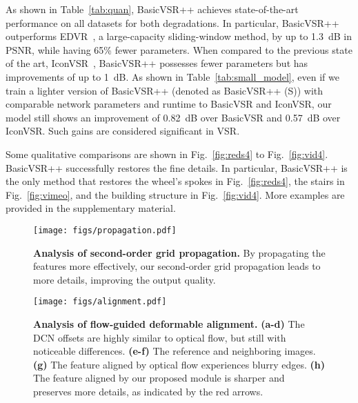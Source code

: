 \documentclass[10pt,twocolumn,letterpaper]{article}
\begin{document}
As shown in Table~\ref{tab:quan}, BasicVSR++ achieves state-of-the-art performance on all datasets for both degradations. In particular, BasicVSR++ outperforms EDVR~\cite{wang2019edvr}, a large-capacity sliding-window method, by up to 1.3~dB in PSNR, while having 65\% fewer parameters. When compared to the previous state of the art, IconVSR~\cite{chan2021basicvsr}, BasicVSR++ possesses fewer parameters but has improvements of up to 1~dB. As shown in Table~\ref{tab:small_model}, even if we train a lighter version of BasicVSR++ (denoted as BasicVSR++ (S)) with comparable network parameters and runtime to BasicVSR and IconVSR, our model still shows an improvement of 0.82~dB over BasicVSR and 0.57~dB over IconVSR. Such gains are considered significant in VSR.

Some qualitative comparisons are shown in Fig.~\ref{fig:reds4} to Fig.~\ref{fig:vid4}. BasicVSR++ successfully restores the fine details. In particular, BasicVSR++ is the only method that restores the wheel's spokes in Fig.~\ref{fig:reds4}, the stairs in Fig.~\ref{fig:vimeo}, and the building structure in Fig.~\ref{fig:vid4}. More examples are provided in the supplementary material.






 \begin{figure*}[!t]
    \begin{center}
        \texttt{[image: figs/propagation.pdf]}
        \vskip -0.3cm
        \caption{\textbf{Analysis of second-order grid propagation.} By propagating the features more effectively, our second-order grid propagation leads to more details, improving the output quality.}
        \label{fig:propagation}
    \end{center}
    \vspace{-0.5cm}
\end{figure*}
\begin{figure*}[!t]
    \begin{center}
        \texttt{[image: figs/alignment.pdf]}
        \vskip -0.3cm
        \caption{\textbf{Analysis of flow-guided deformable alignment.} \textbf{(a-d)} The DCN offsets are highly similar to optical flow, but still with noticeable differences. \textbf{(e-f)} The reference and neighboring images. \textbf{(g)} The feature aligned by optical flow experiences blurry edges. \textbf{(h)} The feature aligned by our proposed module is sharper and preserves more details, as indicated by the red arrows.}
        \label{fig:alignment}
    \end{center}
    \vspace{-0.5cm}
\end{figure*}
\end{document}
